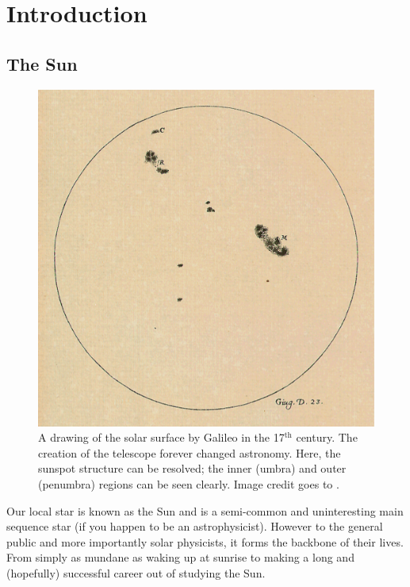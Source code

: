 \graphicspath{{Chapter1/Figs/}}

\chapter{Introduction}
\label{chapter1}
      	
   \vspace*{\fill}\par
   \pagebreak

\section{The Sun}

    \begin{figure}
        \centering
        \includegraphics[width=\textwidth]{23_June_1613.pdf}
        \caption{
                A drawing of the solar surface by Galileo in the 17$^{\mathrm{th}}$ century. 
                The creation of the telescope forever changed astronomy.
                Here, the sunspot structure can be resolved; the inner (umbra) and outer (penumbra) regions can be seen clearly.
                Image credit goes to \cite{galileo}.
               }
        \label{fig:galileo}
    \end{figure}
     
    Our local star is known as the Sun and is a semi-common and uninteresting main sequence star (if you happen to be an astrophysicist).
    However to the general public and more importantly solar physicists, it forms the backbone of their lives.
    From simply as mundane as waking up at sunrise to making a long and (hopefully) successful career out of studying the Sun.
    
